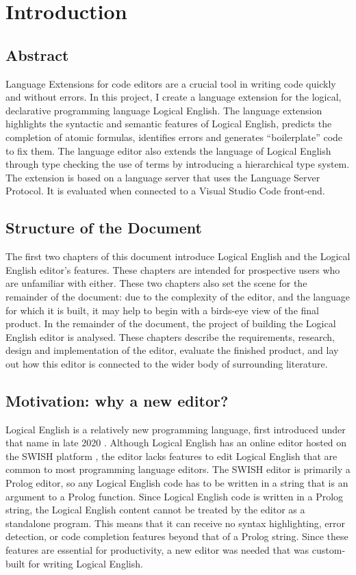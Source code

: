 \documentclass[../main.tex]{subfiles}
\begin{document}
\chapter{Introduction}
\section{Abstract}
Language Extensions for code editors are a crucial tool in writing code quickly and without errors. In this project, I create a language extension for the logical, declarative programming language Logical English. The language extension highlights the syntactic and semantic features of Logical English, predicts the completion of atomic formulas, identifies errors and generates ``boilerplate'' code to fix them. The language editor also extends the language of Logical English through type checking the use of terms by introducing a hierarchical type system. The extension is based on a language server that uses the Language Server Protocol. It is evaluated when connected to a Visual Studio Code front-end.

\section{Structure of the Document}
The first two chapters of this document introduce Logical English and the Logical English editor's features. These chapters are intended for prospective users who are unfamiliar with either. These two chapters also set the scene for the remainder of the document: due to the complexity of the editor, and the language for which it is built, it may help to begin with a birds-eye view of the final product. In the remainder of the document, the project of building the Logical English editor is analysed.  These chapters describe the requirements, research, design and implementation of the editor, evaluate the finished product, and lay out how this editor is connected to the wider body of surrounding literature.

\section{Motivation: why a new editor?}
Logical English is a relatively new programming language, first introduced under that name in late 2020 \cite{logical_english}. Although Logical English has an online editor hosted on the SWISH platform \cite{swish_editor}, the editor lacks features to edit Logical English that are common to most programming language editors. The SWISH editor is primarily a Prolog editor, so any Logical English code has to be written in a string that is an argument to a Prolog function. Since Logical English code is written in a Prolog string, the Logical English content cannot be treated by the editor as a standalone program. This means that it can receive no syntax highlighting, error detection, or code completion features beyond that of a Prolog string. Since these features are essential for productivity, a new editor was needed that was custom-built for writing Logical English.
\end{document}
